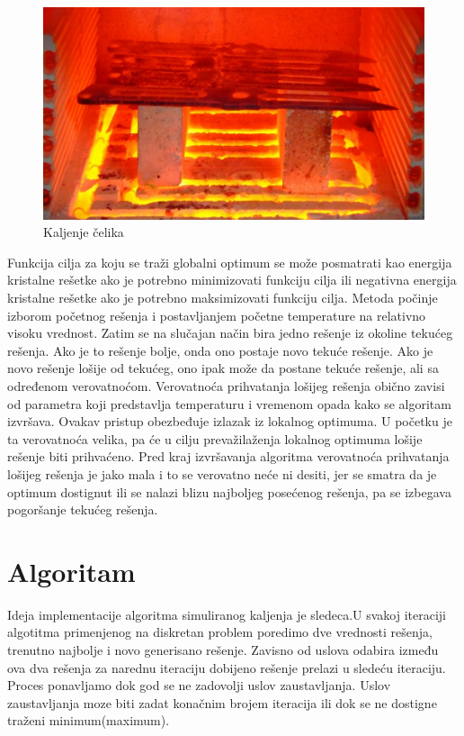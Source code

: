 \documentclass[a4paper]{article}
\begin{document}
\begin{figure}[h!]
\centering
\includegraphics[scale=0.3]{kal.jpg}
\caption{Kaljenje čelika}
\label{fig:universe}
\end{figure}

Funkcija cilja za koju se traži globalni optimum se može posmatrati kao energija kristalne rešetke ako je potrebno minimizovati funkciju cilja ili negativna energija kristalne rešetke ako
je potrebno maksimizovati funkciju cilja. Metoda počinje izborom početnog rešenja i postavljanjem početne temperature na relativno visoku vrednost. Zatim se na slučajan način bira
jedno rešenje iz okoline tekućeg rešenja. Ako je to rešenje bolje, onda ono postaje novo tekuće rešenje. Ako je novo rešenje lošije od tekućeg, ono ipak može da postane tekuće rešenje, ali
sa određenom verovatnoćom. Verovatnoća prihvatanja lošijeg rešenja obično zavisi od parametra koji predstavlja temperaturu i vremenom opada kako se algoritam izvršava. Ovakav pristup obezbeđuje izlazak iz lokalnog optimuma. U početku je ta verovatnoća velika, pa će
u cilju prevažilaženja lokalnog optimuma lošije rešenje biti prihvaćeno. Pred kraj izvršavanja
algoritma verovatnoća prihvatanja lošijeg rešenja je jako mala i to se verovatno neće ni desiti,
jer se smatra da je optimum dostignut ili se nalazi blizu najboljeg posećenog rešenja, pa se
izbegava pogoršanje tekućeg rešenja.


\section{Algoritam}
Ideja implementacije algoritma simuliranog kaljenja je sledeca.U svakoj iteraciji algotitma primenjenog na diskretan problem poredimo dve vrednosti rešenja, trenutno najbolje i novo generisano rešenje. Zavisno od uslova odabira između ova dva rešenja za narednu iteraciju dobijeno rešenje prelazi u sledeću iteraciju. Proces ponavljamo  dok god se ne zadovolji uslov zaustavljanja. Uslov zaustavljanja moze biti zadat konačnim brojem iteracija ili dok se ne dostigne traženi minimum(maximum).
\end{document}
